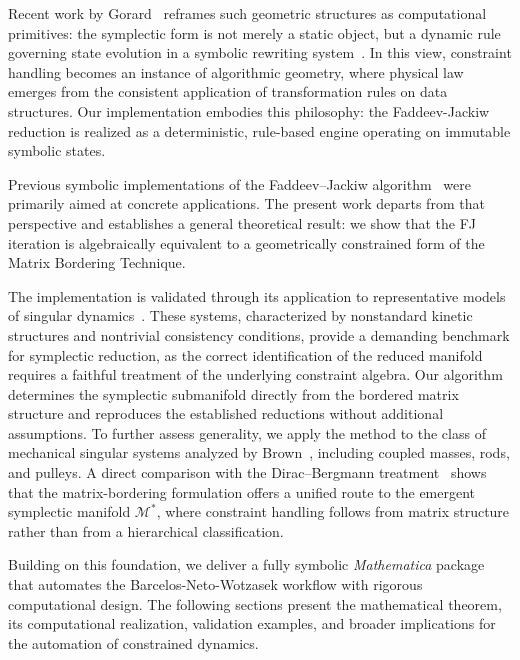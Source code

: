 \documentclass[11pt,a4paper]{article}
\begin{document}
	
	
	Recent work by Gorard~\cite{Gorard2024} reframes such geometric structures as computational primitives: the symplectic form is not merely a static object, but a dynamic rule governing state evolution in a symbolic rewriting system~\cite{Wolfram2002,WolframPhysics2020}. In this view, constraint handling becomes an instance of algorithmic geometry, where physical law emerges from the consistent application of transformation rules on data structures. Our implementation embodies this philosophy: the Faddeev-Jackiw reduction is realized as a deterministic, rule-based engine operating on immutable symbolic states.
	
	
	Previous symbolic implementations of the Faddeev–Jackiw algorithm~\cite{ArellanoPaulinCabrera2024,GomezPandeyThibes2024} were primarily aimed at concrete applications. The present work departs from that perspective and establishes a general theoretical result: we show that the FJ iteration is algebraically equivalent to a geometrically constrained form of the Matrix Bordering Technique.
	
	
	The implementation is validated through its application to representative models of singular dynamics~\cite{HojmanUrrutia1981,MukherjeeSaha1988}. These systems, characterized by nonstandard kinetic structures and nontrivial consistency conditions, provide a demanding benchmark for symplectic reduction, as the correct identification of the reduced manifold requires a faithful treatment of the underlying constraint algebra. Our algorithm determines the symplectic submanifold directly from the bordered matrix structure and reproduces the established reductions without additional assumptions. To further assess generality, we apply the method to the class of mechanical singular systems analyzed by Brown~\cite{Brown2023}, including coupled masses, rods, and pulleys. A direct comparison with the Dirac–Bergmann treatment~\cite{Dirac1964,Bergmann1949} shows that the matrix-bordering formulation offers a unified route to the emergent symplectic manifold $\mathcal{M}^*$, where constraint handling follows from matrix structure rather than from a hierarchical classification.
	
	
	
	Building on this foundation, we deliver a fully symbolic \textit{Mathematica} package that automates the Barcelos-Neto-Wotzasek workflow with rigorous computational design. The following sections present the mathematical theorem, its computational realization, validation examples, and broader implications for the automation of constrained dynamics.
	
\end{document}
